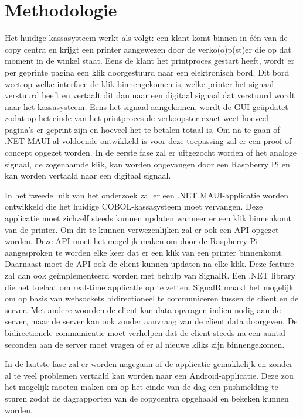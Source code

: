 \section{Methodologie}%
\label{sec:methodologie}

Het huidige kassasysteem werkt als volgt: een klant komt binnen in één van de copy centra en krijgt een printer aangewezen door de verko(o)p(st)er die op dat moment in de winkel staat. Eens de klant het printproces gestart heeft, wordt er per geprinte pagina een klik doorgestuurd naar een elektronisch bord. Dit bord weet op welke interface de klik binnengekomen is, welke printer het signaal verstuurd heeft en vertaalt dit dan naar een digitaal signaal dat verstuurd wordt naar het kassasysteem. Eens het signaal aangekomen, wordt de GUI geüpdatet zodat op het einde van het printproces de verkoopster exact weet hoeveel pagina’s er geprint zijn en hoeveel het te betalen totaal is.
Om na te gaan of .NET MAUI al voldoende ontwikkeld is voor deze toepassing zal er een proof-of-concept opgezet worden. In de eerste fase zal er uitgezocht worden of het analoge signaal, de zogenaamde klik, kan worden opgevangen door een Raspberry Pi en kan worden vertaald naar een digitaal signaal.

In het tweede luik van het onderzoek zal er een .NET MAUI-applicatie worden ontwikkeld die het huidige COBOL-kassasysteem moet vervangen. Deze applicatie moet zichzelf steeds kunnen updaten wanneer er een klik binnenkomt van de printer. Om dit te kunnen verwezenlijken zal er ook een API opgezet worden. Deze API moet het mogelijk maken om door de Raspberry Pi aangesproken te worden elke keer dat er een klik van een printer binnenkomt. Daarnaast moet de API ook de client kunnen updaten na elke klik. Deze feature zal dan ook geïmplementeerd worden met behulp van SignalR. Een .NET library die het toelaat om real-time applicatie op te zetten. SignalR maakt het mogelijk om op basis van websockets bidirectioneel te communiceren tussen de client en de server. Met andere woorden de client kan data opvragen indien nodig aan de server, maar de server kan ook zonder aanvraag van de client data doorgeven. De bidirectionele communicatie moet verhelpen dat de client steeds na een aantal seconden aan de server moet vragen of er al nieuwe kliks zijn binnengekomen.

In de laatste fase zal er worden nagegaan of de applicatie gemakkelijk en zonder al te veel problemen vertaald kan worden naar een Android-applicatie. Deze zou het mogelijk moeten maken om op het einde van de dag een pushmelding te sturen zodat de dagrapporten van de copycentra opgehaald en bekeken kunnen worden.

